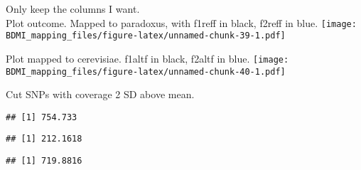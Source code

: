 \documentclass[
]{article}
\newenvironment{Shaded}{\begin{snugshade}}{\end{snugshade}}
\newcommand{\DecValTok}[1]{\textcolor[rgb]{0.00,0.00,0.81}{#1}}
\newcommand{\FunctionTok}[1]{\textcolor[rgb]{0.13,0.29,0.53}{\textbf{#1}}}
\newcommand{\NormalTok}[1]{#1}
\newcommand{\OtherTok}[1]{\textcolor[rgb]{0.56,0.35,0.01}{#1}}
\newcommand{\SpecialCharTok}[1]{\textcolor[rgb]{0.81,0.36,0.00}{\textbf{#1}}}
\begin{document}
Only keep the columns I want.\\

Plot outcome. Mapped to paradoxus, with f1reff in black, f2reff in blue.
\texttt{[image: BDMI\_mapping\_files/figure-latex/unnamed-chunk-39-1.pdf]}

Plot mapped to cerevisiae. f1altf in black, f2altf in blue.
\texttt{[image: BDMI\_mapping\_files/figure-latex/unnamed-chunk-40-1.pdf]}

Cut SNPs with coverage 2 SD above mean.\\

\begin{Shaded}
\end{Shaded}

\begin{verbatim}
## [1] 754.733
\end{verbatim}

\begin{Shaded}
\end{Shaded}

\begin{verbatim}
## [1] 212.1618
\end{verbatim}

\begin{Shaded}
\end{Shaded}

\begin{verbatim}
## [1] 719.8816
\end{verbatim}

\begin{Shaded}
\end{Shaded}
\end{document}
